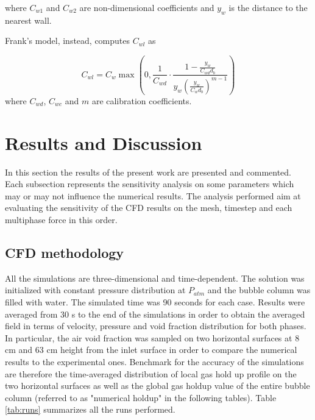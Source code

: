 \documentclass[11pt,a4paper]{article}
\begin{document}
where $C_{w 1}$ and $C_{w 2}$ are non-dimensional coefficients and $y_{w}$ is the distance to the nearest wall.

Frank's model, instead, computes $C_{w l}$ as

\begin{equation}
C_{w l}=C_{w} \max \left(0, \frac{1}{C_{w d}} \cdot \frac{1-\frac{y_{w}}{C_{w d} d_{b}}}{y_{w}\left(\frac{y_{w}}{C_{w} d_{b}}\right)^{m-1}}\right)
\end{equation}
where $C_{w d}$, $C_{w c}$ and $m$ are calibration coefficients.




\section{Results and Discussion}
\label{sec:results}
In this section the results of the present work are presented and commented. Each subsection represents the sensitivity analysis on some parameters which may or may not influence the numerical results. The analysis performed aim at evaluating the sensitivity of the CFD results on the mesh, timestep and each multiphase force in this order.

\subsection{CFD methodology}
\label{sub:methodology}

All the simulations are three-dimensional and time-dependent. The solution was initialized with constant pressure distribution at $P_{atm}$ and the bubble column was filled with water. The simulated time was 90 seconds for each case. Results were averaged from 30 s to the end of the simulations in order to obtain the averaged field in terms of velocity, pressure and void fraction distribution for both phases. In particular, the air void fraction was sampled on two horizontal surfaces at 8 cm and 63 cm height from the inlet surface in order to compare the numerical results to the experimental ones. Benchmark for the accuracy of the simulations are therefore the time-averaged distribution of local gas hold up profile on the two horizontal surfaces as well as the global gas holdup value of the entire bubble column (referred to as "numerical holdup" in the following tables). Table \ref{tab:runs} summarizes all the runs performed.
\end{document}
